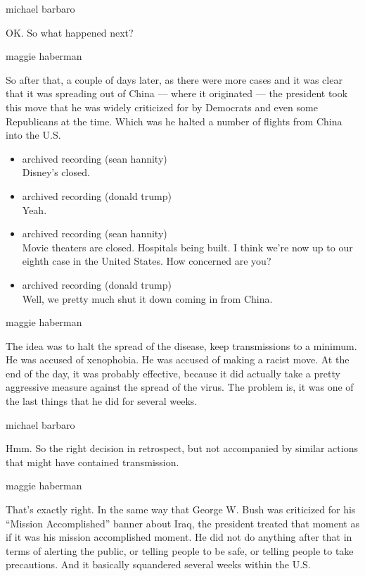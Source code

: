 michael barbaro

OK. So what happened next?

maggie haberman

So after that, a couple of days later, as there were more cases and it
was clear that it was spreading out of China --- where it originated ---
the president took this move that he was widely criticized for by
Democrats and even some Republicans at the time. Which was he halted a
number of flights from China into the U.S.

\begin{itemize}
\item
  archived recording (sean hannity)\\
  Disney's closed.
\item
  archived recording (donald trump)\\
  Yeah.
\item
  archived recording (sean hannity)\\
  Movie theaters are closed. Hospitals being built. I think we're now up
  to our eighth case in the United States. How concerned are you?
\item
  archived recording (donald trump)\\
  Well, we pretty much shut it down coming in from China.
\end{itemize}

maggie haberman

The idea was to halt the spread of the disease, keep transmissions to a
minimum. He was accused of xenophobia. He was accused of making a racist
move. At the end of the day, it was probably effective, because it did
actually take a pretty aggressive measure against the spread of the
virus. The problem is, it was one of the last things that he did for
several weeks.

michael barbaro

Hmm. So the right decision in retrospect, but not accompanied by similar
actions that might have contained transmission.

maggie haberman

That's exactly right. In the same way that George W. Bush was criticized
for his ``Mission Accomplished'' banner about Iraq, the president
treated that moment as if it was his mission accomplished moment. He did
not do anything after that in terms of alerting the public, or telling
people to be safe, or telling people to take precautions. And it
basically squandered several weeks within the U.S.

